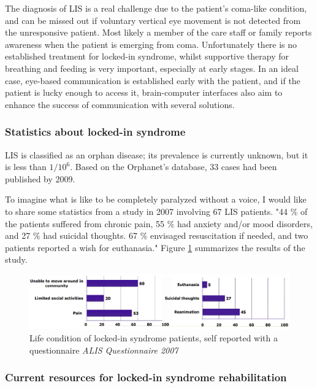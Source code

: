 \documentclass[letterpaper,10pt]{article}
\begin{document}
The diagnosis of LIS is a real challenge due to the patient's coma-like condition, and can be missed out if voluntary vertical eye movement is not detected from the unresponsive patient. Most likely a member of the care staff or family reports awareness when the patient is emerging from coma. Unfortunately there is no established treatment for locked-in syndrome, whilst supportive therapy for breathing and feeding is very important, especially at early stages. \cite{locked_webpage} In an ideal case, eye-based communication is established early with the patient, and if the patient is lucky enough to access it, brain-computer interfaces also aim to enhance the success of communication with several solutions.

\subsubsection{Statistics about locked-in syndrome}

LIS is classified as an orphan disease; its prevalence is currently unknown, but it is less than $1 / 10^{6}$. Based on the Orphanet's database, 33 cases had been published by 2009.\cite{orphanet_LIS}

To imagine what is like to be completely paralyzed without a voice, I would like to share some statistics from a study in 2007 involving 67 LIS patients. "44 \% of the patients suffered from chronic pain, 55 \% had anxiety and/or mood disorders, and 27 \% had suicidal thoughts. 67 \% envisaged resuscitation if needed, and two patients reported a wish for euthanasia." \cite{rousseau} Figure \ref{fig:lockedlife} summarizes the results of the study.


\begin{figure}[h]
\centering
\includegraphics[scale=0.3]{lifeq.jpg}
\caption[Life condition of locked-in syndrome patients, self reported with a questionnaire]{ Life condition of locked-in syndrome patients, self reported with a questionnaire \textit{ALIS Questionnaire 2007} \cite{rousseau}}
\label{fig:lockedlife}
\end{figure}

\subsubsection{Current resources for locked-in syndrome rehabilitation}
\end{document}
